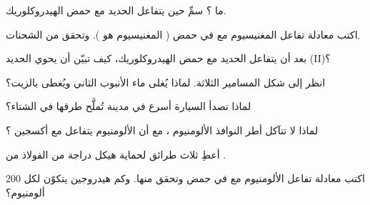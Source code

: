 \begin{exercise}[$\star$]\label{exo:g9:metals-acids-corrosion:4}
ما ؟ سمِّ  حين يتفاعل الحديد مع حمض
الهيدروكلوريك.
\end{exercise}

\begin{exercise}[$\star\star$]\label{exo:g9:metals-acids-corrosion:5}
اكتب معادلة تفاعل المغنيسيوم مع   في حمض ( المغنيسيوم
هو ). وتحقق من الشحنات.
\end{exercise}

\begin{exercise}[$\star\star$]\label{exo:g9:metals-acids-corrosion:6}
بعد أن يتفاعل الحديد مع حمض الهيدروكلوريك، كيف تبيّن أن  يحوي
 الحديد (II)؟
\end{exercise}

\begin{exercise}[$\star\star$]\label{exo:g9:metals-acids-corrosion:7}
انظر إلى شكل المسامير الثلاثة. لماذا يُغلى ماء الأنبوب الثاني ويُغطى
بالزيت؟
\end{exercise}

\begin{exercise}[$\star\star$]\label{exo:g9:metals-acids-corrosion:8}
لماذا تصدأ السيارة أسرع في مدينة تُملَّح طرقها في الشتاء؟
\end{exercise}

\begin{exercise}[$\star\star$]\label{exo:g9:metals-acids-corrosion:9}
لماذا لا تتآكل أطر النوافذ الألومنيوم ، مع أن الألومنيوم يتفاعل
مع أكسجين ؟
\end{exercise}

\begin{exercise}[$\star\star$]\label{exo:g9:metals-acids-corrosion:10}
أعطِ ثلاث طرائق لحماية هيكل دراجة من الفولاذ من .
\end{exercise}

\begin{exercise}[$\star\star\star$]\label{exo:g9:metals-acids-corrosion:11}
اكتب معادلة تفاعل الألومنيوم مع   في حمض وتحقق منها. وكم
 هيدروجين يتكوّن لكل 200
 ألومنيوم؟
\end{exercise}

